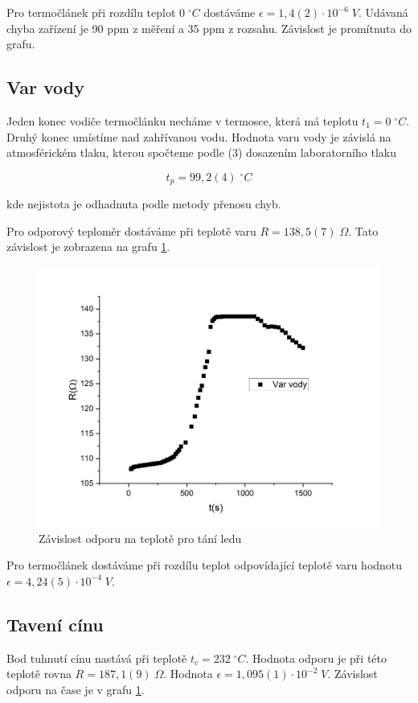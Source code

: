 Pro termočlánek při rozdílu teplot $0 \; ^\circ C$ dostáváme $\epsilon = 1,4(2) \cdot 10^{-6} \; V$. Udávaná chyba zařízení je 90 ppm z měření a 35 ppm z rozsahu. Závislost je promítnuta do grafu.




\subsection{Var vody}

Jeden konec vodiče termočlánku necháme v termosce, která má teplotu $t_1 = 0 \; ^\circ C$. Druhý konec umístíme nad zahřívanou vodu. Hodnota varu vody je závislá na atmosférickém tlaku, kterou spočteme podle (3) dosazením laboratorního tlaku

\begin{equation}
    \nonumber
    t_p = 99,2(4) \; ^\circ C
\end{equation}

kde nejistota je odhadnuta podle metody přenosu chyb.

Pro odporový teploměr dostáváme při teplotě varu $R = 138,5(7) \; \Omega$. Tato závislost je zobrazena na grafu \ref{fig:odpor-na-teplote-var}.

\begin{figure}[h]
    \centering
    \includegraphics[width=0.5\linewidth]{8 - Kalibrace odporového teploměru a termočlánku//Prototkol - kalibrace teploměru//img/Závislost R na t, var vody.png}
    \caption{Závislost odporu na teplotě pro tání ledu}
    \label{fig:odpor-na-teplote-var}
\end{figure}

Pro termočlánek dostáváme při rozdílu teplot odpovídající teplotě varu hodnotu $\epsilon = 4,24(5) \cdot 10^{-4} \; V$.

\newpage
\subsection{Tavení cínu}

Bod tuhnutí cínu nastává při teplotě $t_c = 232 \; ^\circ C$. Hodnota odporu je při této teplotě rovna $R = 187,1(9) \; \Omega$. Hodnota $\epsilon = 1,095(1) \cdot 10^{-2} \; V$. Závislost odporu na čase je v grafu \ref{fig:odpor-na-teplote-var}.

